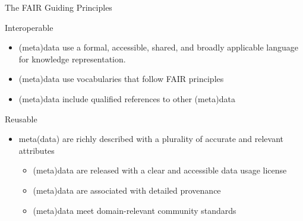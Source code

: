 \documentclass[ignorenonframetext,aspectratio=169,10pt,xcolor=table]{beamer}
\begin{document}
\begin{frame}{The FAIR Guiding Principles}
  \begin{block}{Interoperable}
    \begin{itemize}
    \item (meta)data use a formal, accessible, shared, and broadly applicable language for knowledge representation.
    \item (meta)data use vocabularies that follow FAIR principles
    \item (meta)data include qualified references to other (meta)data
    \end{itemize}
  \end{block}

  \begin{block}{Reusable}
    \begin{itemize}
    \item meta(data) are richly described with a plurality of accurate and relevant attributes
      \begin{itemize}
      \item (meta)data are released with a clear and accessible data usage license
      \item (meta)data are associated with detailed provenance
      \item (meta)data meet domain-relevant community standards
      \end{itemize}
    \end{itemize}
  \end{block}


\end{frame}
\end{document}
